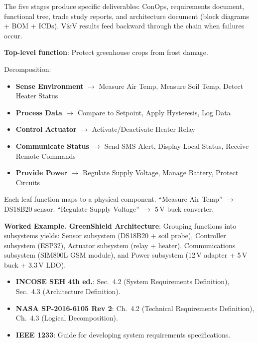 \documentclass[11pt,letterpaper,twoside,openany]{book}
\begin{document}
The five stages produce specific deliverables: ConOps, requirements document, functional tree, trade study reports, and architecture document (block diagrams + BOM + ICDs). V\&V results feed backward through the chain when failures occur.


\begin{greenshieldbox}
\textbf{Top-level function}: Protect greenhouse crops from frost damage.

Decomposition:
\begin{itemize}[nosep,leftmargin=1.5em]
\item \textbf{Sense Environment} $\to$ Measure Air Temp, Measure Soil Temp, Detect Heater Status
\item \textbf{Process Data} $\to$ Compare to Setpoint, Apply Hysteresis, Log Data
\item \textbf{Control Actuator} $\to$ Activate/Deactivate Heater Relay
\item \textbf{Communicate Status} $\to$ Send SMS Alert, Display Local Status, Receive Remote Commands
\item \textbf{Provide Power} $\to$ Regulate Supply Voltage, Manage Battery, Protect Circuits
\end{itemize}
Each leaf function maps to a physical component. ``Measure Air Temp'' $\to$ DS18B20 sensor. ``Regulate Supply Voltage'' $\to$ 5\,V buck converter.

\textbf{Worked Example. GreenShield Architecture}: Grouping functions into subsystems yields: Sensor subsystem (DS18B20 + soil probe), Controller subsystem (ESP32), Actuator subsystem (relay + heater), Communications subsystem (SIM800L GSM module), and Power subsystem (12\,V adapter + 5\,V buck + 3.3\,V LDO).
\end{greenshieldbox}

\begin{keyconceptbox}
\begin{itemize}[nosep,leftmargin=1.5em]
\item \textbf{INCOSE SEH 4th ed.}: Sec.\ 4.2 (System Requirements Definition), Sec.\ 4.3 (Architecture Definition).
\item \textbf{NASA SP-2016-6105 Rev 2}: Ch.\ 4.2 (Technical Requirements Definition), Ch.\ 4.3 (Logical Decomposition).
\item \textbf{IEEE 1233}: Guide for developing system requirements specifications.
\end{itemize}
\end{keyconceptbox}
\end{document}
